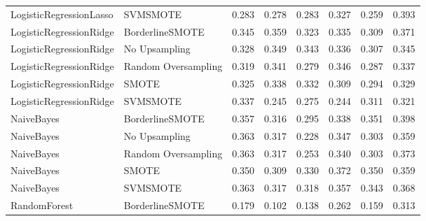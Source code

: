 \begin{tabular}{llllllll}
     LogisticRegressionLasso &            SVMSMOTE & 0.283 &                     0.278 &                 0.283 &                  0.327 &                                   0.259 &     0.393 \\
     LogisticRegressionRidge &     BorderlineSMOTE & 0.345 &                     0.359 &                 0.323 &                  0.335 &                                   0.309 &     0.371 \\
     LogisticRegressionRidge &       No Upsampling & 0.328 &                     0.349 &                 0.343 &                  0.336 &                                   0.307 &     0.345 \\
     LogisticRegressionRidge & Random Oversampling & 0.319 &                     0.341 &                 0.279 &                  0.346 &                                   0.287 &     0.337 \\
     LogisticRegressionRidge &               SMOTE & 0.325 &                     0.338 &                 0.332 &                  0.309 &                                   0.294 &     0.329 \\
     LogisticRegressionRidge &            SVMSMOTE & 0.337 &                     0.245 &                 0.275 &                  0.244 &                                   0.311 &     0.321 \\
                  NaiveBayes &     BorderlineSMOTE & 0.357 &                     0.316 &                 0.295 &                  0.338 &                                   0.351 &     0.398 \\
                  NaiveBayes &       No Upsampling & 0.363 &                     0.317 &                 0.228 &                  0.347 &                                   0.303 &     0.359 \\
                  NaiveBayes & Random Oversampling & 0.363 &                     0.317 &                 0.253 &                  0.340 &                                   0.303 &     0.373 \\
                  NaiveBayes &               SMOTE & 0.350 &                     0.309 &                 0.330 &                  0.372 &                                   0.350 &     0.359 \\
                  NaiveBayes &            SVMSMOTE & 0.363 &                     0.317 &                 0.318 &                  0.357 &                                   0.343 &     0.368 \\
                RandomForest &     BorderlineSMOTE & 0.179 &                     0.102 &                 0.138 &                  0.262 &                                   0.159 &     0.313 \\

\end{tabular}
